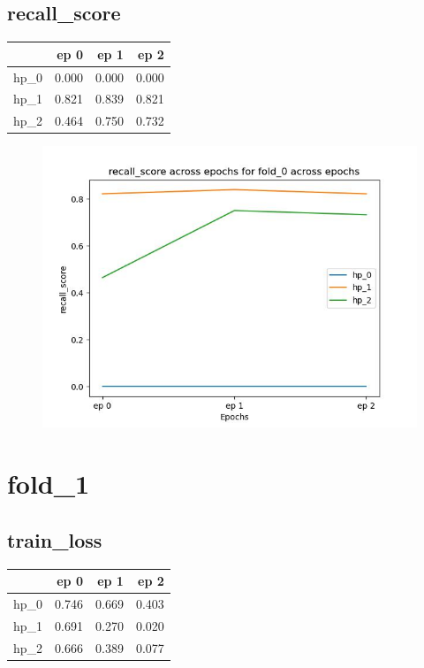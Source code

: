 \documentclass{article}
\begin{document}
\subsection{recall\_score}
\begin{tabular}{lrrr}
\toprule
{} &   ep 0 &   ep 1 &   ep 2 \\
\midrule
hp\_0 &  0.000 &  0.000 &  0.000 \\
hp\_1 &  0.821 &  0.839 &  0.821 \\
hp\_2 &  0.464 &  0.750 &  0.732 \\
\bottomrule
\end{tabular}

\begin{figure}[H]
\includegraphics[scale = 0.75]{fold_0/recall_score}
\end{figure}
\section{fold\_1}
\subsection{train\_loss}
\begin{tabular}{lrrr}
\toprule
{} &   ep 0 &   ep 1 &   ep 2 \\
\midrule
hp\_0 &  0.746 &  0.669 &  0.403 \\
hp\_1 &  0.691 &  0.270 &  0.020 \\
hp\_2 &  0.666 &  0.389 &  0.077 \\
\bottomrule
\end{tabular}
\end{document}
